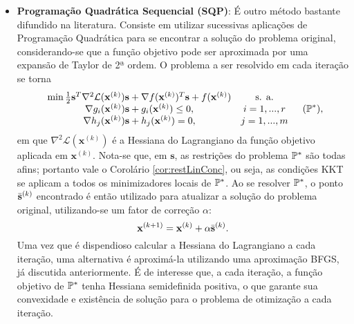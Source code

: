 \begin{itemize}
\item \textbf{Programa\c{c}\~{a}o Quadr\'{a}tica Sequencial (SQP)}: \'{E} outro m\'{e}todo bastante difundido na literatura. Consiste em utilizar sucessivas aplica\c{c}\~{o}es de Programa\c{c}\~{a}o Quadr\'{a}tica para se encontrar a solu\c{c}\~{a}o do problema original, considerando-se que a fun\c{c}\~{a}o objetivo pode ser aproximada por uma expans\~{a}o de Taylor de 2ª ordem. O problema a ser resolvido em cada itera\c{c}\~{a}o se torna
\begin{equation}
\begin{array}{ccc}
\min \frac{1}{2}\mathbf{s}^{T}\nabla^2 \mathcal{L}(\mathbf{x}^{(k)})\mathbf{s} + \nabla f(\mathbf{x}^{(k)})^{T}\mathbf{s} + f(\mathbf{x}^{(k)})& \text{s. a.} &\\
\nabla g_i (\mathbf{x}^{(k)})\mathbf{s} + g_i (\mathbf{x}^{(k)})\le 0, & i = 1,...,r&\\
\nabla h_j (\mathbf{x}^{(k)})\mathbf{s} + h_j (\mathbf{x}^{(k)}) = 0, & j = 1,...,m&
\end{array} (\mathbb{P}^{*}),
\end{equation}
em que $\nabla^2 \mathcal{L}(\mathbf{x}^{(k)})$ \'{e} a Hessiana do Lagrangiano da fun\c{c}\~{a}o objetivo aplicada em $\mathbf{x}^{(k)}$. Nota-se que, em $\mathbf{s}$, as restri\c{c}\~{o}es do problema $\mathbb{P}^{*}$ s\~{a}o todas afins; portanto vale o Corol\'{a}rio \ref{cor:restLinConc}, ou seja, as condi\c{c}\~{o}es KKT se aplicam a todos os minimizadores locais de $\mathbb{P}^{*}$. Ao se resolver $\mathbb{P}^{*}$, o ponto $\bar{\mathbf{s}}^{(k)}$ encontrado \'{e} ent\~{a}o utilizado para atualizar a solu\c{c}\~{a}o do problema original, utilizando-se um fator de corre\c{c}\~{a}o $\alpha$:
\begin{equation}
\mathbf{x}^{(k+1)} = \mathbf{x}^{(k)} + \alpha \bar{\mathbf{s}}^{(k)}.
\end{equation} 
Uma vez que \'{e} dispendioso calcular a Hessiana do Lagrangiano a cada itera\c{c}\~{a}o, uma alternativa \'{e} aproxim\'{a}-la utilizando uma aproxima\c{c}\~{a}o BFGS, j\'{a} discutida anteriormente. \'{E} de interesse que, a cada itera\c{c}\~{a}o, a fun\c{c}\~{a}o objetivo de $\mathbb{P}^{*}$ tenha Hessiana semidefinida positiva, o que garante sua convexidade e exist\^{e}ncia de solu\c{c}\~{a}o para o problema de otimiza\c{c}\~{a}o a cada itera\c{c}\~{a}o.


\end{itemize}
